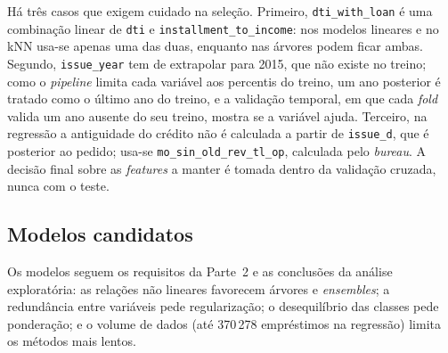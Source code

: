 {\sloppy
Há três casos que exigem cuidado na seleção. Primeiro, \texttt{dti\_with\_loan} é uma combinação linear de \texttt{dti} e \texttt{installment\_to\_income}: nos modelos lineares e no kNN usa-se apenas uma das duas, enquanto nas árvores podem ficar ambas. Segundo, \texttt{issue\_year} tem de extrapolar para 2015, que não existe no treino; como o \textit{pipeline} limita cada variável aos percentis do treino, um ano posterior é tratado como o último ano do treino, e a validação temporal, em que cada \textit{fold} valida um ano ausente do seu treino, mostra se a variável ajuda. Terceiro, na regressão a antiguidade do crédito não é calculada a partir de \texttt{issue\_d}, que é posterior ao pedido; usa-se \texttt{mo\_sin\_old\_rev\_tl\_op}, calculada pelo \textit{bureau}. A decisão final sobre as \textit{features} a manter é tomada dentro da validação cruzada, nunca com o teste.
\par}

\subsection{Modelos candidatos}
\label{sec:mod-candidatos}

Os modelos seguem os requisitos da Parte~2 e as conclusões da análise exploratória: as relações não lineares favorecem árvores e \textit{ensembles}; a redundância entre variáveis pede regularização; o desequilíbrio das classes pede ponderação; e o volume de dados (até 370\,278 empréstimos na regressão) limita os métodos mais lentos.

